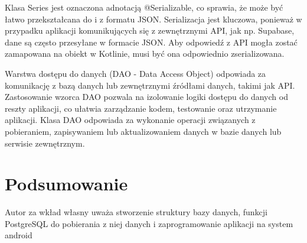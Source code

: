 \documentclass[12pt,twoside]{article}
\begin{document}
Klasa Series jest oznaczona adnotacją @Serializable, co sprawia, że może być łatwo przekształcana do i z formatu 
JSON. Serializacja jest kluczowa, ponieważ w przypadku aplikacji komunikujących się z zewnętrznymi API, jak np. 
Supabase, dane są często przesyłane w formacie JSON. Aby odpowiedź z API mogła zostać zamapowana na obiekt w 
Kotlinie, musi być ona odpowiednio zserializowana.

Warstwa dostępu do danych (DAO - Data Access Object) odpowiada za komunikację z bazą danych lub zewnętrznymi 
źródłami danych, takimi jak API. Zastosowanie wzorca DAO pozwala na izolowanie logiki dostępu do danych od reszty 
aplikacji, co ułatwia zarządzanie kodem, testowanie oraz utrzymanie aplikacji. Klasa DAO odpowiada za wykonanie 
operacji związanych z pobieraniem, zapisywaniem lub aktualizowaniem danych w bazie danych lub serwisie zewnętrznym.

\clearpage

\section{Podsumowanie}

Autor za wkład własny uważa stworzenie struktury bazy danych, funkcji PostgreSQL do pobierania z niej danych i 
zaprogramowanie aplikacji na system android 

\clearpage


\begin{thebibliography}{4}
\end{thebibliography}

\clearpage

\makesummary
\end{document}

